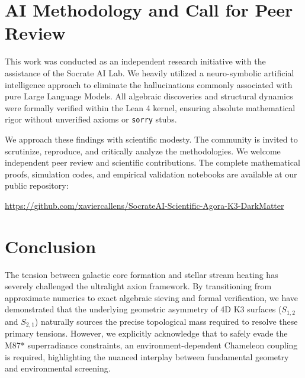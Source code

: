 \documentclass[11pt,a4paper]{article}
\begin{document}
\section{AI Methodology and Call for Peer Review}
This work was conducted as an independent research initiative with the assistance of the Socrate AI Lab. We heavily utilized a neuro-symbolic artificial intelligence approach to eliminate the hallucinations commonly associated with pure Large Language Models. All algebraic discoveries and structural dynamics were formally verified within the Lean 4 kernel, ensuring absolute mathematical rigor without unverified axioms or \texttt{sorry} stubs. 

We approach these findings with scientific modesty. The community is invited to scrutinize, reproduce, and critically analyze the methodologies. We welcome independent peer review and scientific contributions. The complete mathematical proofs, simulation codes, and empirical validation notebooks are available at our public repository:
\begin{center}
    \url{https://github.com/xaviercallens/SocrateAI-Scientific-Agora-K3-DarkMatter}
\end{center}

\section{Conclusion}
The tension between galactic core formation and stellar stream heating has severely challenged the ultralight axion framework. By transitioning from approximate numerics to exact algebraic sieving and formal verification, we have demonstrated that the underlying geometric asymmetry of 4D K3 surfaces ($S_{1,2}$ and $S_{2,1}$) naturally sources the precise topological mass required to resolve these primary tensions. However, we explicitly acknowledge that to safely evade the M87* superradiance constraints, an environment-dependent Chameleon coupling is required, highlighting the nuanced interplay between fundamental geometry and environmental screening.



\end{document}
